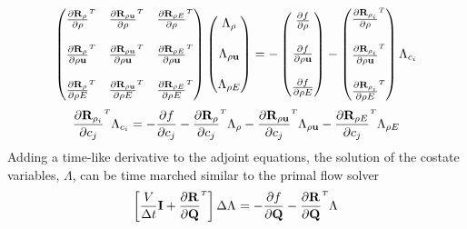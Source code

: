 \begin{equation}
  \begin{pmatrix}
    \rtdiff{\rho}{\rho}     & \rtdiff{\rho \vu}{\rho}     & \rtdiff{\rho E}{\rho} \\ \\
    \rtdiff{\rho}{\rho \vu} & \rtdiff{\rho \vu}{\rho \vu} & \rtdiff{\rho E}{\rho \vu} \\ \\
    \rtdiff{\rho}{\rho E}   & \rtdiff{\rho \vu}{\rho E}   & \rtdiff{\rho E}{\rho E}
  \end{pmatrix}
  \begin{pmatrix}
    \adjlam{\rho} \\ \\
    \adjlam{\rho \vu} \\ \\
    \adjlam{\rho E}
  \end{pmatrix}
  = -
  \begin{pmatrix}
    \pd{f}{\rho} \\ \\
    \pd{f}{\rho \vu} \\ \\
    \pd{f}{\rho E}
  \end{pmatrix}
  -
  \begin{pmatrix}
    \rtdiff{\rho_i}{\rho} \\ \\
    \rtdiff{\rho_i}{\rho \vu} \\ \\
    \rtdiff{\rho_i}{\rho E}
  \end{pmatrix}
  \adjlam{c_i}
  \label{dc-adjoint-1}
\end{equation}
\begin{equation}
  \rtdiff{\rho_i}{c_j}
  \adjlam{c_i}
  = -\pd{f}{c_j}
  - \rtdiff{\rho}{c_j} \adjlam{\rho}
  - \rtdiff{\rho \vu}{c_j} \adjlam{\rho \vu}
  - \rtdiff{\rho E}{c_j} \adjlam{\rho E}
  \label{dc-adjoint-2}
\end{equation}
Adding a time-like derivative to the adjoint equations, the solution of the
costate variables, $\Lambda$, can be time marched similar to the primal flow
solver
\begin{equation}
  \left[ \frac{V}{\Delta t} \mi + \rtdiff{}{\mq} \right] \Delta
  \adjlam{}
  = -\pd{f}{\mq} - \rtdiff{}{\mq} \adjlam{}
  \label{adj-dc-time-general}
\end{equation}
